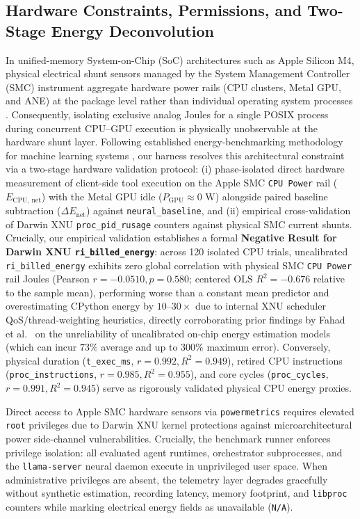 \documentclass[11pt,a4paper]{article}
\begin{document}
\subsection{Hardware Constraints, Permissions, and Two-Stage Energy Deconvolution}
In unified-memory System-on-Chip (SoC) architectures such as Apple Silicon M4, physical electrical shunt sensors managed by the System Management Controller (SMC) instrument aggregate hardware power rails (CPU clusters, Metal GPU, and ANE) at the package level rather than individual operating system processes \cite{fahad2019comparative}. Consequently, isolating exclusive analog Joules for a single POSIX process during concurrent CPU--GPU execution is physically unobservable at the hardware shunt layer. Following established energy-benchmarking methodology for machine learning systems \cite{you2023zeus, fahad2019comparative}, our harness resolves this architectural constraint via a two-stage hardware validation protocol: (i) phase-isolated direct hardware measurement of client-side tool execution on the Apple SMC \texttt{CPU Power} rail ($E_{\text{CPU, net}}$) with the Metal GPU idle ($P_{\text{GPU}} \approx 0\text{ W}$) alongside paired baseline subtraction ($\Delta E_{\text{net}}$) against \texttt{neural\_baseline}, and (ii) empirical cross-validation of Darwin XNU \texttt{proc\_pid\_rusage} counters against physical SMC current shunts. Crucially, our empirical validation establishes a formal \textbf{Negative Result for Darwin XNU \texttt{ri\_billed\_energy}}: across 120 isolated CPU trials, uncalibrated \texttt{ri\_billed\_energy} exhibits zero global correlation with physical SMC \texttt{CPU Power} rail Joules (Pearson $r = -0.0510, p = 0.580$; centered $\text{OLS } R^2 = -0.676$ relative to the sample mean), performing worse than a constant mean predictor and overestimating CPython energy by $10\text{--}30\times$ due to internal XNU scheduler QoS/thread-weighting heuristics, directly corroborating prior findings by Fahad et al.~\cite{fahad2019comparative} on the unreliability of uncalibrated on-chip energy estimation models (which can incur $73\%$ average and up to $300\%$ maximum error). Conversely, physical duration (\texttt{t\_exec\_ms}, $r = 0.992, R^2 = 0.949$), retired CPU instructions (\texttt{proc\_instructions}, $r = 0.985, R^2 = 0.955$), and core cycles (\texttt{proc\_cycles}, $r = 0.991, R^2 = 0.945$) serve as rigorously validated physical CPU energy proxies.

Direct access to Apple SMC hardware sensors via \texttt{powermetrics} requires elevated \texttt{root} privileges due to Darwin XNU kernel protections against microarchitectural power side-channel vulnerabilities. Crucially, the benchmark runner enforces privilege isolation: all evaluated agent runtimes, orchestrator subprocesses, and the \texttt{llama-server} neural daemon execute in unprivileged user space. When administrative privileges are absent, the telemetry layer degrades gracefully without synthetic estimation, recording latency, memory footprint, and \texttt{libproc} counters while marking electrical energy fields as unavailable (\texttt{N/A}).
\end{document}
